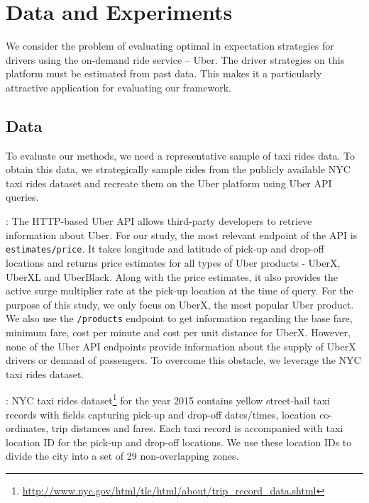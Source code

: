 
\section{Data and Experiments}
\label{sec:experiments}

We consider the problem of evaluating optimal in expectation strategies for drivers using the on-demand ride service -- Uber. The driver strategies on this platform must be estimated from past data. This makes it a particularly attractive application for evaluating our framework.

\subsection{Data}
\label{sec:data}
To evaluate our methods, we need a representative sample of taxi rides data. To obtain this data, we strategically sample rides from the publicly available NYC taxi rides dataset and recreate them on the Uber platform using Uber API queries.

: 
The HTTP-based Uber API allows third-party developers to retrieve information about Uber. For our study, the most relevant endpoint of the API is \texttt{estimates/price}. It takes longitude and latitude of pick-up and drop-off locations and returns price estimates for all types of Uber products - UberX, UberXL and UberBlack. Along with the price estimates, it also provides the active surge multiplier rate at the pick-up location at the time of query. For the purpose of this study, we only focus on UberX, the most popular Uber product. We also use the \texttt{/products} endpoint to get information regarding the base fare, minimum fare, cost per minute and cost per unit distance for UberX. However, none of the Uber API endpoints provide information about the supply of UberX drivers or demand of passengers. To overcome this obstacle, we leverage the NYC taxi rides dataset.

:
NYC taxi rides dataset\footnote{\url{http://www.nyc.gov/html/tlc/html/about/trip_record_data.shtml}} for the year 2015 contains yellow street-hail taxi records with fields capturing pick-up and drop-off dates/times, location co-ordinates, trip distances and fares. Each taxi record is accompanied with taxi location ID for the pick-up and drop-off locations. We use these location IDs to divide the city into a set of 29 non-overlapping zones.

